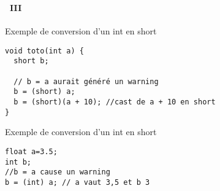 \begin{frame}[containsverbatim]
  \frametitle{\secname}
  \framesubtitle{\subsecname~III}

  \begin{exampleblock}{Exemple de conversion d'un int en short}
    \begin{verbatim}
void toto(int a) {
  short b;
  
  // b = a aurait généré un warning
  b = (short) a;
  b = (short)(a + 10); //cast de a + 10 en short
}\end{verbatim}
  \end{exampleblock}
  \begin{exampleblock}{Exemple de conversion d'un int en short}
    \begin{verbatim}
float a=3.5;
int b;
//b = a cause un warning
b = (int) a; // a vaut 3,5 et b 3\end{verbatim}
  \end{exampleblock}
\end{frame}

